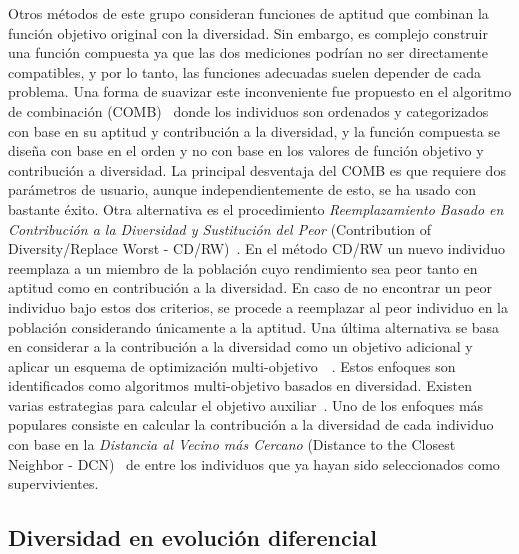Otros métodos de este grupo consideran funciones de aptitud que combinan la función objetivo original con la diversidad.
%
Sin embargo, es complejo construir una función compuesta ya que las dos mediciones podrían no ser directamente compatibles,
y por lo tanto, las funciones adecuadas suelen depender de cada problema.
%
Una forma de suavizar este inconveniente fue propuesto en el algoritmo de combinación (COMB)~\cite{vidal2013hybrid} donde los individuos son ordenados 
y categorizados con base en su aptitud y contribución a la diversidad, y la función compuesta se diseña con base en el orden y no con base en los valores de función objetivo
y contribución a diversidad.
%
La principal desventaja del COMB es que requiere dos parámetros de usuario, aunque independientemente de esto, se ha usado con bastante éxito.
%
Otra alternativa es el procedimiento \textit{Reemplazamiento Basado en Contribución a la Diversidad y Sustitución del Peor} 
(Contribution of Diversity/Replace Worst - CD/RW)~\cite{lozano2008replacement}.
%
En el método CD/RW un nuevo individuo reemplaza a un miembro de la población cuyo rendimiento sea peor tanto en aptitud como en contribución a la diversidad.
%
En caso de no encontrar un peor individuo bajo estos dos criterios, se procede a reemplazar al peor individuo en la población considerando únicamente a la aptitud.
%
Una última alternativa se basa en considerar a la contribución a la diversidad como un objetivo adicional y aplicar un esquema de 
optimización multi-objetivo~\cite{bui2005multiobjective}~\cite{mouret2011novelty}.
%
Estos enfoques son identificados como algoritmos multi-objetivo basados en diversidad.
%
Existen varias estrategias para calcular el objetivo auxiliar~\cite{segura2013using}.
%
Uno de los enfoques más populares consiste en calcular la contribución a la diversidad de cada individuo con base en 
la \textit{Distancia al Vecino más Cercano} (Distance to the Closest Neighbor - DCN)~\cite{segura2016novel} de entre los individuos que ya hayan sido seleccionados
como supervivientes.


\subsection{Diversidad en evolución diferencial}


